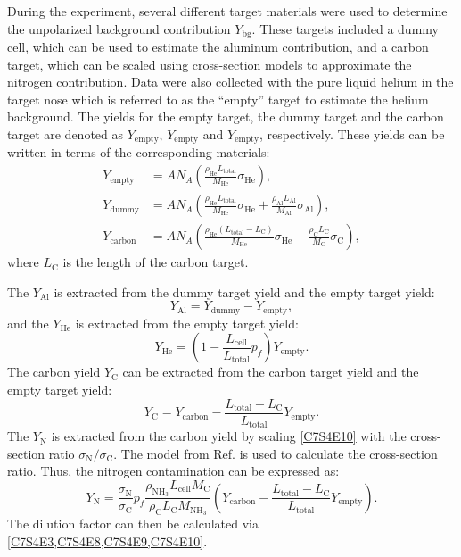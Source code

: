 During the experiment, several different target materials were used to determine the unpolarized background contribution $Y_{\mathrm{bg}}$. These targets included a dummy cell, which can be used to estimate the aluminum contribution, and a carbon target, which can be scaled using cross-section models to approximate the nitrogen contribution. Data were also collected with the pure liquid helium in the target nose which is referred to as the ``empty'' target to estimate the helium background. The yields for the empty target, the dummy target and the carbon target are denoted as $Y_{\mathrm{empty}}$, $Y_{\mathrm{empty}}$ and $Y_{\mathrm{empty}}$, respectively. These yields can be written in terms of the corresponding materials:
\begin{align} \label{C7S4E5}
Y_{\mathrm{empty}} & = AN_A\left(\frac{\rho_{\mathrm{He}}L_{\mathrm{total}}}{M_{\mathrm{He}}}\sigma_{\mathrm{He}}\right), \\ \label{C7S4E6}
Y_{\mathrm{dummy}} & = AN_A\left(\frac{\rho_{\mathrm{He}}L_{\mathrm{total}}}{M_{\mathrm{He}}}\sigma_{\mathrm{He}}+\frac{\rho_{\mathrm{Al}}L_{\mathrm{Al}}}{M_{\mathrm{Al}}}\sigma_{\mathrm{Al}}\right), \\ \label{C7S4E7}
Y_{\mathrm{carbon}} & = AN_A\left(\frac{\rho_{\mathrm{He}}(L_{\mathrm{total}}-L_{\mathrm{C}})}{M_{\mathrm{He}}}\sigma_{\mathrm{He}}+\frac{\rho_{\mathrm{C}}L_{\mathrm{C}}}{M_{\mathrm{C}}}\sigma_{\mathrm{C}}\right),
\end{align}
where $L_{\mathrm{C}}$ is the length of the carbon target.

The $Y_{\mathrm{Al}}$ is extracted from the dummy target yield and the empty target yield:
\begin{equation} \label{C7S4E8}
Y_{\mathrm{Al}} = Y_{\mathrm{dummy}}-Y_{\mathrm{empty}},
\end{equation}
and the $Y_{\mathrm{He}}$ is extracted from the empty target yield:
\begin{equation} \label{C7S4E9}
Y_{\mathrm{He}} = \left(1-\frac{L_{\mathrm{cell}}}{L_{\mathrm{total}}}p_f\right)Y_{\mathrm{empty}}.
\end{equation}
The carbon yield $Y_{\mathrm{C}}$ can be extracted from the carbon target yield and the empty target yield:
\begin{equation} \label{C7S4E10}
Y_{\mathrm{C}} = Y_{\mathrm{carbon}}-\frac{L_{\mathrm{total}}-L_{\mathrm{C}}}{L_{\mathrm{total}}}Y_{\mathrm{empty}}.
\end{equation}
The $Y_{\mathrm{N}}$ is extracted from the carbon yield by scaling \cref{C7S4E10} with the cross-section ratio $\sigma_{\mathrm{N}}/\sigma_{\mathrm{C}}$. The model from Ref. \cite{Bosted2008} is used to calculate the cross-section ratio. Thus, the nitrogen contamination can be expressed as:
\begin{equation} \label{C7S4E11}
Y_{\mathrm{N}} = \frac{\sigma_{\mathrm{N}}}{\sigma_{\mathrm{C}}}p_f\frac{\rho_{\mathrm{NH_3}}L_{\mathrm{cell}}M_{\mathrm{C}}}{\rho_{\mathrm{C}}L_{\mathrm{C}}M_{\mathrm{NH_3}}}\left(Y_{\mathrm{carbon}}-\frac{L_{\mathrm{total}}-L_{\mathrm{C}}}{L_{\mathrm{total}}}Y_{\mathrm{empty}}\right).
\end{equation}
The dilution factor can then be calculated via \cref{C7S4E3,C7S4E8,C7S4E9,C7S4E10}.

